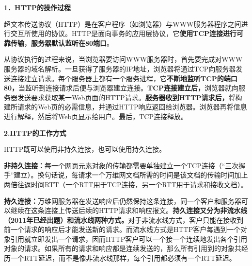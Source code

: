 \textbf{{1．HTTP的操作过程}}

超文本传送协议（HTTP）是在客户程序（如浏览器）与WWW服务器程序之间进行交互所使用的协议。HTTP是面向事务的应用层协议，它{\textbf{使用TCP连接进行可靠传输}}，\textbf{服务器默认监听在80端口}。

从协议执行的过程来说，当浏览器要访问WWW服务器时，首先要完成对WWW服务器的域名解析。一旦获得了服务器的IP地址，浏览器将通过TCP向服务器发送连接建立请求。每个服务器上都有一个服务进程，它\textbf{不断地监听TCP的端口80，}当监听到连接请求后便与浏览器建立连接。\textbf{TCP连接建立后，}浏览器就向服务器发送要求获取某一Web页面的HTTP请求。\textbf{服务器收到HTTP请求后，}将构建所请求的Web页的必需信息，并通过HTTP响应返回给浏览器。浏览器再将信息进行解释，然后将Web页显示给用户。最后，TCP连接释放。

{\textbf{2.}}{\textbf{HTTP的工作方式}}

HTTP既可以使用非持久连接，也可以使用持久连接。

\textbf{{非持久连接：}}每一个网页元素对象的传输都需要单独建立一个TCP连接（``三次握手''建立）。换句话说，每请求一个万维网文档所需的时间是该文档的传输时间加上两倍往返时间RTT（一个RTT用于TCP连接，另一个RTT用于请求和接收文档）。

\textbf{{持久连接：}}万维网服务器在发送响应后仍然保持这条连接，同一个客户和服务器可以继续在这条连接上传送后续的HTTP请求和响应报文。\textbf{持久连接又分为非流水线（2011年已经出题）和流水线两种方式。}对于非流水线方式，客户只能在接收到前一个请求的响应后才能发送新的请求。而流水线方式是HTTP客户每遇到一个对象引用就立即发出一个请求，因而HTTP客户可以一个接一个连续地发出各个引用对象的请求。如果所有的请求和响应都是连续发送的，那么所有引用到的对象共经历一个RTT延迟，而不是像非流水线那样，每个引用都必须有一个RTT延迟。
